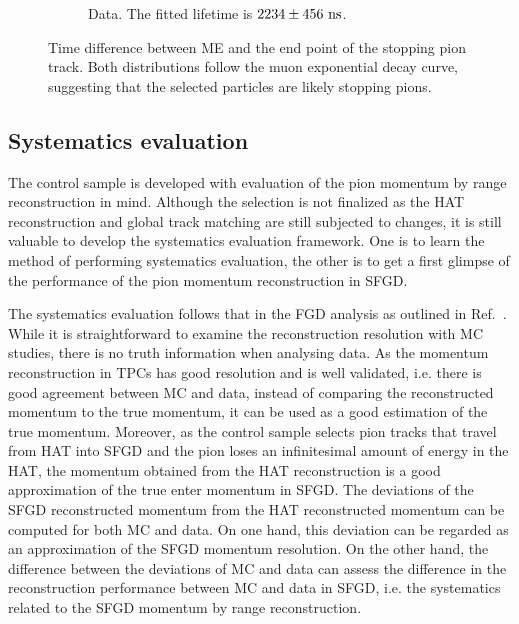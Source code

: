 \begin{figure}[ht]
\begin{subfigure}{\dbfigwid\textwidth}
                    \caption{Data. The fitted lifetime is $2234\pm456~\textrm{ns}$.}
                    \label{subfig:sppi-me-data}
               \end{subfigure}
               \caption{Time difference between ME and the end point of the stopping pion track. Both distributions follow the muon exponential decay curve, suggesting that the selected particles are likely stopping pions.}
               \label{fig:sppi-me-td}
          \end{figure}

          \subsection{Systematics evaluation}
          \label{sec:sppi-syst}
          The control sample is developed with evaluation of the pion momentum by range reconstruction in mind.
          Although the selection is not finalized as the HAT reconstruction and global track matching are still subjected to changes, it is still valuable to develop the systematics evaluation framework.
          One is to learn the method of performing systematics evaluation, the other is to get a first glimpse of the performance of the pion momentum reconstruction in SFGD.

          The systematics evaluation follows that in the FGD analysis as outlined in Ref.~\cite{Jenkins:2022ljx}.
          While it is straightforward to examine the reconstruction resolution with MC studies, there is no truth information when analysing data.
          As the momentum reconstruction in TPCs has good resolution and is well validated, i.e. there is good agreement between MC and data, instead of comparing the reconstructed momentum to the true momentum, it can be used as a good estimation of the true momentum.
          Moreover, as the control sample selects pion tracks that travel from HAT into SFGD and the pion loses an infinitesimal amount of energy in the HAT, the momentum obtained from the HAT reconstruction is a good approximation of the true enter momentum in SFGD.
          The deviations of the SFGD reconstructed momentum from the HAT reconstructed momentum can be computed for both MC and data.
          On one hand, this deviation can be regarded as an approximation of the SFGD momentum resolution.
          On the other hand, the difference between the deviations of MC and data can assess the difference in the reconstruction performance between MC and data in SFGD, i.e. the systematics related to the SFGD momentum by range reconstruction.

